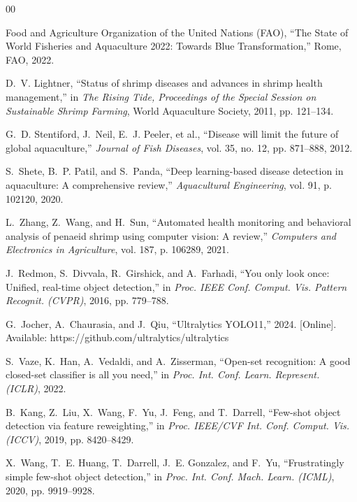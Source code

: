 \documentclass[conference]{IEEEtran}
\begin{document}
\begin{thebibliography}{00}

Food and Agriculture Organization of the United Nations (FAO), ``The State of World Fisheries and Aquaculture 2022: Towards Blue Transformation,'' Rome, FAO, 2022.

D.~V. Lightner, ``Status of shrimp diseases and advances in shrimp health management,'' in \textit{The Rising Tide, Proceedings of the Special Session on Sustainable Shrimp Farming}, World Aquaculture Society, 2011, pp. 121--134.

G.~D. Stentiford, J.~Neil, E.~J. Peeler, et al., ``Disease will limit the future of global aquaculture,'' \textit{Journal of Fish Diseases}, vol. 35, no. 12, pp. 871--888, 2012.

S.~Shete, B.~P. Patil, and S.~Panda, ``Deep learning-based disease detection in aquaculture: A comprehensive review,'' \textit{Aquacultural Engineering}, vol. 91, p. 102120, 2020.

L.~Zhang, Z.~Wang, and H.~Sun, ``Automated health monitoring and behavioral analysis of penaeid shrimp using computer vision: A review,'' \textit{Computers and Electronics in Agriculture}, vol. 187, p. 106289, 2021.

J.~Redmon, S.~Divvala, R.~Girshick, and A.~Farhadi, ``You only look once: Unified, real-time object detection,'' in \textit{Proc. IEEE Conf. Comput. Vis. Pattern Recognit. (CVPR)}, 2016, pp. 779--788.

G.~Jocher, A.~Chaurasia, and J.~Qiu, ``Ultralytics YOLO11,'' 2024. [Online]. Available: https://github.com/ultralytics/ultralytics

S.~Vaze, K.~Han, A.~Vedaldi, and A.~Zisserman, ``Open-set recognition: A good closed-set classifier is all you need,'' in \textit{Proc. Int. Conf. Learn. Represent. (ICLR)}, 2022.

B.~Kang, Z.~Liu, X.~Wang, F.~Yu, J.~Feng, and T.~Darrell, ``Few-shot object detection via feature reweighting,'' in \textit{Proc. IEEE/CVF Int. Conf. Comput. Vis. (ICCV)}, 2019, pp. 8420--8429.

X.~Wang, T.~E. Huang, T.~Darrell, J.~E. Gonzalez, and F.~Yu, ``Frustratingly simple few-shot object detection,'' in \textit{Proc. Int. Conf. Mach. Learn. (ICML)}, 2020, pp. 9919--9928.


\end{thebibliography}
\end{document}
